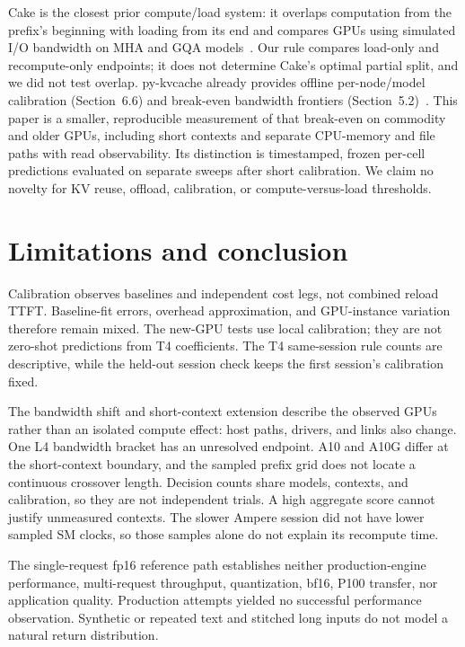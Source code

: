 \documentclass[10pt]{article}
\begin{document}
Cake is the closest prior compute/load system: it overlaps computation from the prefix's beginning with loading from its end and compares GPUs using simulated I/O bandwidth on MHA and GQA models~\citep{cake}. Our rule compares load-only and recompute-only endpoints; it does not determine Cake's optimal partial split, and we did not test overlap. py-kvcache already provides offline per-node/model calibration (Section~6.6) and break-even bandwidth frontiers (Section~5.2)~\citep{pykvcache}. This paper is a smaller, reproducible measurement of that break-even on commodity and older GPUs, including short contexts and separate CPU-memory and file paths with read observability. Its distinction is timestamped, frozen per-cell predictions evaluated on separate sweeps after short calibration. We claim no novelty for KV reuse, offload, calibration, or compute-versus-load thresholds.

\section{Limitations and conclusion}\label{sec:limits}
Calibration observes baselines and independent cost legs, not combined reload TTFT. Baseline-fit errors, overhead approximation, and GPU-instance variation therefore remain mixed. The new-GPU tests use local calibration; they are not zero-shot predictions from T4 coefficients. The T4 same-session rule counts are descriptive, while the held-out session check keeps the first session's calibration fixed.

The bandwidth shift and short-context extension describe the observed GPUs rather than an isolated compute effect: host paths, drivers, and links also change. One L4 bandwidth bracket has an unresolved endpoint. A10 and A10G differ at the short-context boundary, and the sampled prefix grid does not locate a continuous crossover length. Decision counts share models, contexts, and calibration, so they are not independent trials. A high aggregate score cannot justify unmeasured contexts. The slower Ampere session did not have lower sampled SM clocks, so those samples alone do not explain its recompute time.

The single-request fp16 reference path establishes neither production-engine performance, multi-request throughput, quantization, bf16, P100 transfer, nor application quality. Production attempts yielded no successful performance observation. Synthetic or repeated text and stitched long inputs do not model a natural return distribution.
\end{document}
